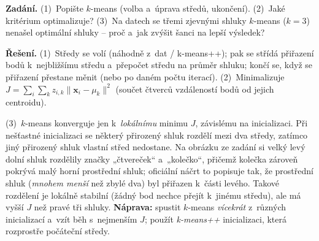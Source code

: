 \begin{priklad}
\par
\textbf{Zadání.} (1)~Popište $k$-means (volba a~úprava středů, ukončení). (2)~Jaké kritérium optimalizuje? (3)~Na datech se třemi zjevnými shluky $k$-means ($k=3$) nenašel optimální shluky -- proč a~jak zvýšit šanci na lepší výsledek?

\smallskip
\textbf{Řešení.} (1)~Středy se volí (náhodně z~dat / k-means++); pak se střídá přiřazení bodů k~nejbližšímu středu a~přepočet středu na průměr shluku; končí se, když se přiřazení přestane měnit (nebo po daném počtu iterací). (2)~Minimalizuje $J=\sum_{i}\sum_{k}z_{i,k}\|\mathbf{x}_i-\mu_k\|^2$ (součet čtverců vzdáleností bodů od jejich centroidu).

(3)~$k$-means konverguje jen k~\emph{lokálnímu} minimu $J$, závislému na inicializaci. Při nešťastné inicializaci se některý přirozený shluk rozdělí mezi dva středy, zatímco jiný přirozený shluk vlastní střed nedostane. Na obrázku ze zadání si velký levý dolní shluk rozdělily značky „čtvereček`` a~„kolečko``, přičemž kolečka zároveň pokrývá malý horní prostřední shluk; oficiální náčrt to popisuje tak, že prostřední shluk (\emph{mnohem menší} než zbylé dva) byl přiřazen k~části levého. Takové rozdělení je lokálně stabilní (žádný bod nechce přejít k~jinému středu), ale má vyšší $J$ než pravé tři shluky. \textbf{Náprava:} spustit $k$-means \emph{vícekrát} z~různých inicializací a~vzít běh s~nejmenším $J$; použít \emph{k-means++} inicializaci, která rozprostře počáteční středy.
\end{priklad}


